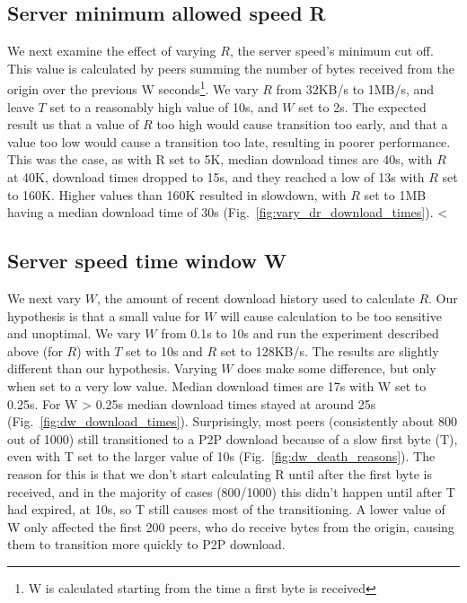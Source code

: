 \subsection{Server minimum allowed speed R}

We next examine the effect of varying $R$, the server speed's minimum cut off. This value is calculated 
by peers summing the number of bytes received from the origin over the previous W seconds\footnote{W is calculated 
starting from the time a first byte is received}. We vary $R$ from 32KB/s to 1MB/s, and leave $T$ set to a 
reasonably high value of 10s, and $W$ set to 2s. The expected result us that a value of $R$ too high would cause transition 
too early, and that a value too low would cause a transition too late, resulting in poorer performance. This was the case, as with R set 
to 5K, median download times are 40s, with $R$ at 40K, download times dropped to 15s, and they reached 
a low of 13s with $R$ set to 160K. Higher values than 160K resulted in slowdown, with $R$ set to 1MB having 
a median download time of 30s (Fig.~\ref{fig:vary_dr_download_times}). 
<%

\subsection{Server speed time window W}

We next vary $W$, the amount of recent download history used to calculate $R$. Our hypothesis is that 
a small value for $W$ will cause calculation to be too sensitive and unoptimal. We vary $W$ from 0.1s 
to 10s and run the experiment described above (for $R$) with $T$ set to 10s and $R$ set to 128KB/s. The results are 
slightly different than our hypothesis. Varying $W$ does make some difference, but only when set 
to a very low value. Median download times are 17s with W set to 0.25s. For W \textgreater{} 0.25s 
median download times stayed at around 25s (Fig.~\ref{fig:dw_download_times}). Surprisingly, 
most peers (consistently about 800 out of 1000) still transitioned to a P2P download because of 
a slow first byte (T), even with T set to the larger value of 10s (Fig.~\ref{fig:dw_death_reasons}). 
The reason for this is that we don't start calculating R until after the first byte is received, and 
in the majority of cases (800/1000) this didn't happen until after T had expired, at 10s, so T still 
causes most of the transitioning. A lower value of W only affected the first 
200 peers, who do receive bytes from the origin, causing them to transition more quickly to P2P download. 

